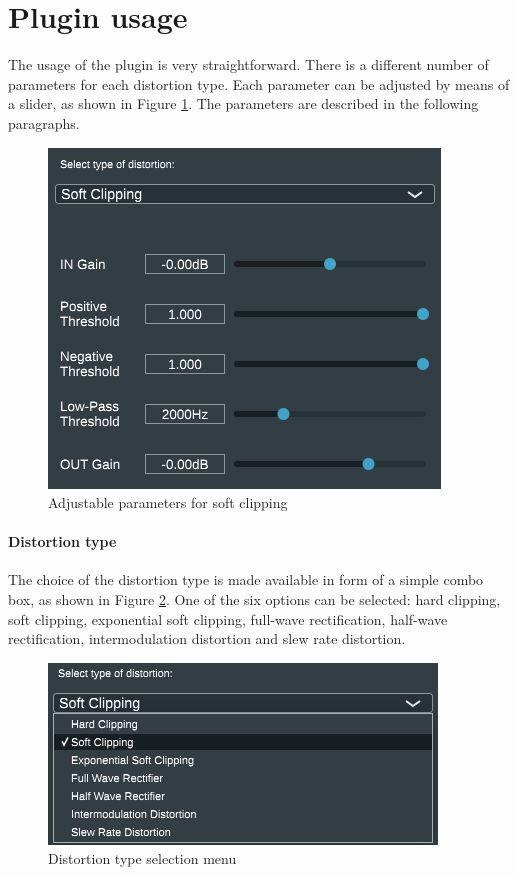 \documentclass{article}
\begin{document}
\section{Plugin usage}
The usage of the plugin is very straightforward. There is a different number of parameters for each distortion type. Each parameter can be adjusted by means of a slider, as shown in Figure \ref{fig:parameters_soft}. The parameters are described in the following paragraphs.
\begin{figure}[!ht]
\centering
\includegraphics[scale=0.6]{images/cmlshw2_soft.png}
\caption{Adjustable parameters for soft clipping}
\label{fig:parameters_soft}
\end{figure}
\paragraph{Distortion type} The choice of the distortion type is made available in form of a simple combo box, as shown in Figure \ref{fig:dist_type_combobox}. One of the six options can be selected: hard clipping, soft clipping, exponential soft clipping, full-wave rectification, half-wave rectification, intermodulation distortion and slew rate distortion.
\begin{figure}[!ht]
\centering
\includegraphics[scale=0.6]{images/cmlshw2_tendina.png}
\caption{Distortion type selection menu}
\label{fig:dist_type_combobox}
\end{figure}
\end{document}
